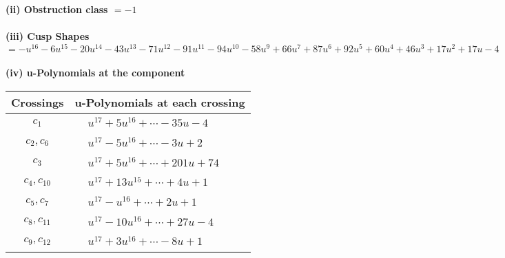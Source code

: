 \documentclass[1p]{elsarticle_modified}
\theoremstyle{definition}
\begin{document}
\flushleft \textbf{(ii) Obstruction class $= -1$}\\~\\
\flushleft \textbf{(iii) Cusp Shapes $= - u^{16}-6 u^{15}-20 u^{14}-43 u^{13}-71 u^{12}-91 u^{11}-94 u^{10}-58 u^9+66 u^7+87 u^6+92 u^5+60 u^4+46 u^3+17 u^2+17 u-4$}\\~\\
\newpage\renewcommand{\arraystretch}{1}
\flushleft \textbf{(iv) u-Polynomials at the component}\newline \\
\begin{tabular}{m{50pt}|m{274pt}}
Crossings & \hspace{64pt}u-Polynomials at each crossing \\
\hline $$\begin{aligned}c_{1}\end{aligned}$$&$\begin{aligned}
&u^{17}+5 u^{16}+\cdots-35 u-4
\end{aligned}$\\
\hline $$\begin{aligned}c_{2},c_{6}\end{aligned}$$&$\begin{aligned}
&u^{17}-5 u^{16}+\cdots-3 u+2
\end{aligned}$\\
\hline $$\begin{aligned}c_{3}\end{aligned}$$&$\begin{aligned}
&u^{17}+5 u^{16}+\cdots+201 u+74
\end{aligned}$\\
\hline $$\begin{aligned}c_{4},c_{10}\end{aligned}$$&$\begin{aligned}
&u^{17}+13 u^{15}+\cdots+4 u+1
\end{aligned}$\\
\hline $$\begin{aligned}c_{5},c_{7}\end{aligned}$$&$\begin{aligned}
&u^{17}- u^{16}+\cdots+2 u+1
\end{aligned}$\\
\hline $$\begin{aligned}c_{8},c_{11}\end{aligned}$$&$\begin{aligned}
&u^{17}-10 u^{16}+\cdots+27 u-4
\end{aligned}$\\
\hline $$\begin{aligned}c_{9},c_{12}\end{aligned}$$&$\begin{aligned}
&u^{17}+3 u^{16}+\cdots-8 u+1
\end{aligned}$\\
\hline
\end{tabular}\\~\\
\end{document}
